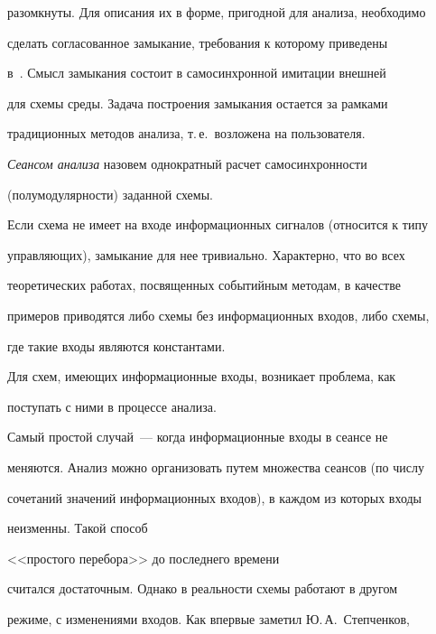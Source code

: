 разомкнуты. Для описания их в форме, пригодной для анализа, необходимо 


сделать согласованное замыкание, требования к которому приведены 


в~\cite{1-4}. Смысл замыкания состоит в самосинхронной имитации внешней 


для схемы среды. Задача построения замыкания остается за рамками 


традиционных методов анализа, т.\,е.\ возложена на пользователя.





\textit{Сеансом анализа} назовем однократный расчет самосинхронности 


(полумодулярности) заданной схемы.





Если схема не имеет на входе информационных сигналов (относится к типу 


управляющих), замыкание для нее тривиально. Характерно, что во всех 


теоретических работах, посвященных событийным методам, в качестве 


примеров приводятся либо схе\-мы без информационных входов, либо схемы, 


где такие входы являются константами.





Для схем, имеющих информационные входы, возникает проб\-ле\-ма, как 


поступать с ними в процессе анализа.











Самый простой случай~--- когда информационные входы в сеансе не 


меняются. Анализ можно организовать путем множества сеансов (по числу 


сочетаний значений информационных входов), в каждом из которых входы 


неизменны. Такой способ


 <<простого перебора>> до последнего времени 


считался достаточным. Однако в реальности схемы работают в другом 


режиме,  с изменениями входов. Как впервые заметил Ю.\,А.~Степченков,


